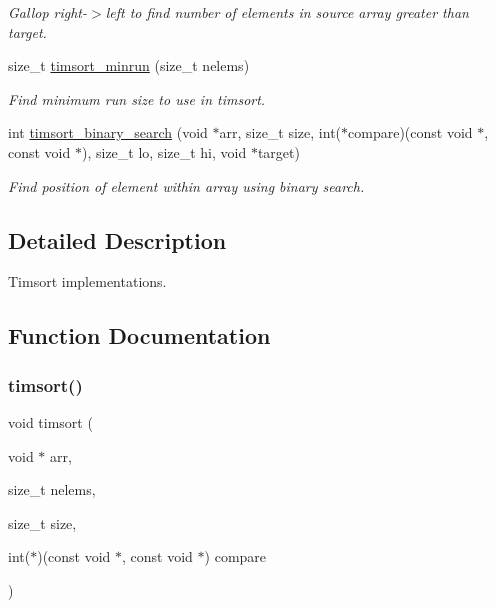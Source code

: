 \begin{DoxyCompactItemize}
\begin{DoxyCompactList}\small\item\em Gallop right-\/$>$left to find number of elements in source array greater than target. \end{DoxyCompactList}\item 
size\+\_\+t \hyperlink{group__Timsort_ga7d1b40d5d91736aa4b5362896cdc68f3}{timsort\+\_\+minrun} (size\+\_\+t nelems)
\begin{DoxyCompactList}\small\item\em Find minimum run size to use in timsort. \end{DoxyCompactList}\item 
int \hyperlink{group__Timsort_gac9b25eb89bf429f324330ee07a9c9400}{timsort\+\_\+binary\+\_\+search} (void $\ast$arr, size\+\_\+t size, int($\ast$compare)(const void $\ast$, const void $\ast$), size\+\_\+t lo, size\+\_\+t hi, void $\ast$target)
\begin{DoxyCompactList}\small\item\em Find position of element within array using binary search. \end{DoxyCompactList}\end{DoxyCompactItemize}


\subsection{Detailed Description}
Timsort implementations. 



\subsection{Function Documentation}
\mbox{\label{group__Timsort_ga1c9fca70060e37617156b89b387aa4d3}} 
\subsubsection{\texorpdfstring{timsort()}{timsort()}}
{\footnotesize\ttfamily void timsort (\begin{DoxyParamCaption}\item[{void $\ast$}]{arr,  }\item[{size\+\_\+t}]{nelems,  }\item[{size\+\_\+t}]{size,  }\item[{int($\ast$)(const void $\ast$, const void $\ast$)}]{compare }\end{DoxyParamCaption})}



